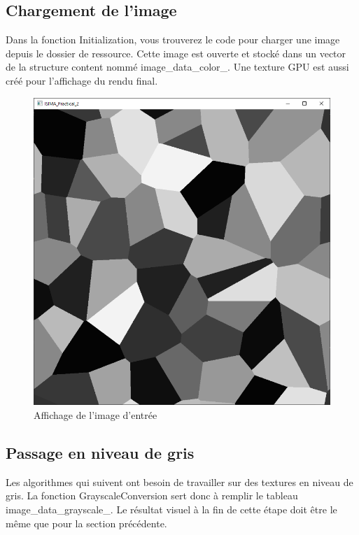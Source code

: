 \documentclass{article}
\begin{document}
\subsection{Chargement de l'image}
Dans la fonction Initialization, vous trouverez le code pour charger une image depuis le dossier de ressource. Cette image est ouverte et stocké dans un vector de la structure content nommé image\_data\_color\_. Une texture GPU est aussi créé pour l'affichage du rendu final.
\begin{figure}[H]
	\centering
	\includegraphics[scale=0.4]{images/input_image.png}
	\caption{Affichage de l'image d'entrée}
\end{figure}

\subsection{Passage en niveau de gris}
Les algorithmes qui suivent ont besoin de travailler sur des textures en niveau de gris. La fonction GrayscaleConversion sert donc à remplir le tableau image\_data\_grayscale\_. Le résultat visuel à la fin de cette étape doit être le même que pour la section précédente.
\end{document}
